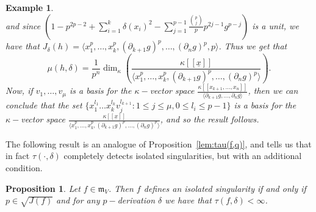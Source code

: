 \documentclass{article}
\newtheorem{proposition}[theorem]{Proposition}
\newtheorem{example}[theorem]{Example}
\newcommand{\maxV}{\mathfrak{m}_V}
\numberwithin{theorem}{section}
\begin{document}
\begin{example}
\begin{equation*}
    \end{equation*}
    \textup{and since $(1-p^{2p-2} + \sum_{i=1}^k \delta(x_i)^2 -\sum_{j=1}^{p-1} \frac{\binom{p}{j}}{p} p^{2j-1} g^{p-j})$ is a unit, we have that $J_\delta(h) = \langle x_1^p, \dots, x_k^p, (\partial_{k+1} g)^p, \dots, (\partial_n g)^p, p \rangle$. Thus we get that}
    \begin{equation*}
        \mu(h, \delta) = \frac{1}{p^n} \dim_\kappa \left(\frac{\kappa[[\underline{x}]]}{\langle x_1^p, \dots, x_k^p, (\partial_{k+1} g)^p, \dots, (\partial_n g)^p \rangle}\right).
    \end{equation*} 
    \noindent\textup{Now, if $v_1, \dots, v_\mu$ is a basis for the $\kappa-$vector space $\frac{\kappa[[x_{k+1}, \dots, x_n]]}{\langle  \partial_{k+1} g, \dots, \partial_n g \rangle}$, then we can conclude that the set $\{x_1^{l_1} \dots x_k^{l_k} v_j^{l_{k+1}} \colon 1 \leq j \leq \mu, 0 \leq l_i \leq p-1\}$ is a basis for the $\kappa-$vector space $\frac{\kappa[[\underline{x}]]}{\langle x_1^p, \dots, x_k^p, (\partial_{k+1} g)^p, \dots, (\partial_n g)^p \rangle}$, and so the result follows. }
\end{example}

The following result is an analogue of Proposition~\ref{lem:tau(f,q)}, and tells us that in fact $\tau(\cdot,\delta)$ completely detects isolated singularities, but with an additional condition. 


\begin{proposition}\label{prop:finite_tjurina}
    Let $f \in \maxV$. Then $f$ defines an isolated singularity if and only if $p \in \sqrt{J\left(f\right)}$ and for any $p-$derivation $\delta$ we have that $\tau(f, \delta) < \infty$.
\end{proposition}
\end{document}
